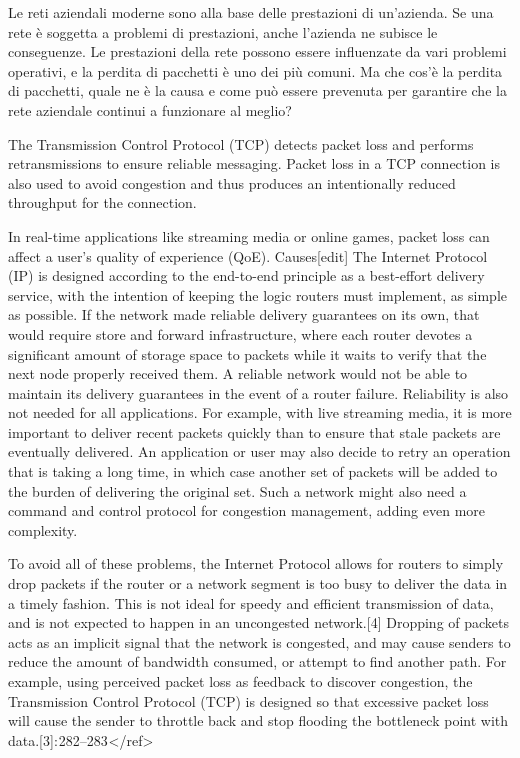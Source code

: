 Le reti aziendali moderne sono alla base delle prestazioni di un’azienda. Se una rete è soggetta a problemi di prestazioni, anche l’azienda ne subisce le conseguenze. Le prestazioni della rete possono essere influenzate da vari problemi operativi, e la perdita di pacchetti è uno dei più comuni. Ma che cos’è la perdita di pacchetti, quale ne è la causa e come può essere prevenuta per garantire che la rete aziendale continui a funzionare al meglio?

The Transmission Control Protocol (TCP) detects packet loss and performs retransmissions to ensure reliable messaging. Packet loss in a TCP connection is also used to avoid congestion and thus produces an intentionally reduced throughput for the connection.

In real-time applications like streaming media or online games, packet loss can affect a user's quality of experience (QoE).
Causes[edit]
The Internet Protocol (IP) is designed according to the end-to-end principle as a best-effort delivery service, with the intention of keeping the logic routers must implement, as simple as possible. If the network made reliable delivery guarantees on its own, that would require store and forward infrastructure, where each router devotes a significant amount of storage space to packets while it waits to verify that the next node properly received them. A reliable network would not be able to maintain its delivery guarantees in the event of a router failure. Reliability is also not needed for all applications. For example, with live streaming media, it is more important to deliver recent packets quickly than to ensure that stale packets are eventually delivered. An application or user may also decide to retry an operation that is taking a long time, in which case another set of packets will be added to the burden of delivering the original set. Such a network might also need a command and control protocol for congestion management, adding even more complexity.

To avoid all of these problems, the Internet Protocol allows for routers to simply drop packets if the router or a network segment is too busy to deliver the data in a timely fashion. This is not ideal for speedy and efficient transmission of data, and is not expected to happen in an uncongested network.[4] Dropping of packets acts as an implicit signal that the network is congested, and may cause senders to reduce the amount of bandwidth consumed, or attempt to find another path. For example, using perceived packet loss as feedback to discover congestion, the Transmission Control Protocol (TCP) is designed so that excessive packet loss will cause the sender to throttle back and stop flooding the bottleneck point with data.[3]: 282–283 </ref>


